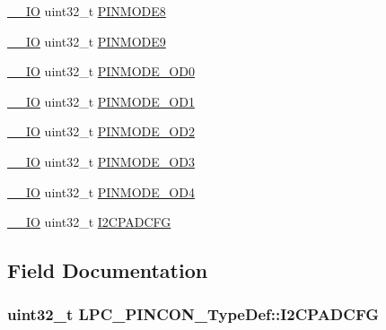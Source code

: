 \begin{DoxyCompactItemize}
\item 
\hyperlink{LPC17xx_8h_aec43007d9998a0a0e01faede4133d6be}{\+\_\+\+\_\+\+IO} uint32\+\_\+t \hyperlink{structLPC__PINCON__TypeDef_ae470e1df56d5eaa7a0f216531b6e465c}{P\+I\+N\+M\+O\+D\+E8}
\item 
\hyperlink{LPC17xx_8h_aec43007d9998a0a0e01faede4133d6be}{\+\_\+\+\_\+\+IO} uint32\+\_\+t \hyperlink{structLPC__PINCON__TypeDef_a5a5ba7aa7e81abd3ddb312066aa7ab18}{P\+I\+N\+M\+O\+D\+E9}
\item 
\hyperlink{LPC17xx_8h_aec43007d9998a0a0e01faede4133d6be}{\+\_\+\+\_\+\+IO} uint32\+\_\+t \hyperlink{structLPC__PINCON__TypeDef_a5e995e337a0a89b201a8b213bf3725de}{P\+I\+N\+M\+O\+D\+E\+\_\+\+O\+D0}
\item 
\hyperlink{LPC17xx_8h_aec43007d9998a0a0e01faede4133d6be}{\+\_\+\+\_\+\+IO} uint32\+\_\+t \hyperlink{structLPC__PINCON__TypeDef_a52c4234993cd3aa45c009dc70725158c}{P\+I\+N\+M\+O\+D\+E\+\_\+\+O\+D1}
\item 
\hyperlink{LPC17xx_8h_aec43007d9998a0a0e01faede4133d6be}{\+\_\+\+\_\+\+IO} uint32\+\_\+t \hyperlink{structLPC__PINCON__TypeDef_a94d763bd4b3a4df7b002a11935f31dfe}{P\+I\+N\+M\+O\+D\+E\+\_\+\+O\+D2}
\item 
\hyperlink{LPC17xx_8h_aec43007d9998a0a0e01faede4133d6be}{\+\_\+\+\_\+\+IO} uint32\+\_\+t \hyperlink{structLPC__PINCON__TypeDef_a56edcc0d31e729815309973d51625186}{P\+I\+N\+M\+O\+D\+E\+\_\+\+O\+D3}
\item 
\hyperlink{LPC17xx_8h_aec43007d9998a0a0e01faede4133d6be}{\+\_\+\+\_\+\+IO} uint32\+\_\+t \hyperlink{structLPC__PINCON__TypeDef_a828f895d55b40a005599ae485b90800b}{P\+I\+N\+M\+O\+D\+E\+\_\+\+O\+D4}
\item 
\hyperlink{LPC17xx_8h_aec43007d9998a0a0e01faede4133d6be}{\+\_\+\+\_\+\+IO} uint32\+\_\+t \hyperlink{structLPC__PINCON__TypeDef_ab31a22fdc19423a35a7e9862b60db3ce}{I2\+C\+P\+A\+D\+C\+FG}
\end{DoxyCompactItemize}


\subsection{Field Documentation}
\subsubsection[{\texorpdfstring{I2\+C\+P\+A\+D\+C\+FG}{I2CPADCFG}}]{ uint32\+\_\+t L\+P\+C\+\_\+\+P\+I\+N\+C\+O\+N\+\_\+\+Type\+Def\+::\+I2\+C\+P\+A\+D\+C\+FG}\hypertarget{structLPC__PINCON__TypeDef_ab31a22fdc19423a35a7e9862b60db3ce}{}\label{structLPC__PINCON__TypeDef_ab31a22fdc19423a35a7e9862b60db3ce}

